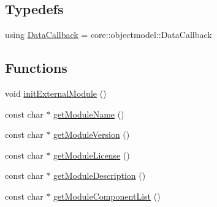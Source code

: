 \subsection*{Typedefs}
\begin{DoxyCompactItemize}
\item 
using \hyperlink{namespacesofa_1_1rgbdtracking_a00834a9204a667746fef9a402ccbfb55}{Data\+Callback} = core\+::objectmodel\+::\+Data\+Callback
\end{DoxyCompactItemize}
\subsection*{Functions}
\begin{DoxyCompactItemize}
\item 
void \hyperlink{namespacesofa_1_1rgbdtracking_a596d0c2a2b98cc3dd0091e933070ecce}{init\+External\+Module} ()
\item 
const char $\ast$ \hyperlink{namespacesofa_1_1rgbdtracking_a71f655bffd81cca5c72c2fc4a0aa72d3}{get\+Module\+Name} ()
\item 
const char $\ast$ \hyperlink{namespacesofa_1_1rgbdtracking_ac45b27a5c97c1ec95aa078ac013bcca7}{get\+Module\+Version} ()
\item 
const char $\ast$ \hyperlink{namespacesofa_1_1rgbdtracking_a3d5dee9f71234c539f75d68e90eb4120}{get\+Module\+License} ()
\item 
const char $\ast$ \hyperlink{namespacesofa_1_1rgbdtracking_a720f3a55d983babc84a6f4ce8ce7d67f}{get\+Module\+Description} ()
\item 
const char $\ast$ \hyperlink{namespacesofa_1_1rgbdtracking_a7687b3685880c0911d3f8f2e97000f5d}{get\+Module\+Component\+List} ()
\end{DoxyCompactItemize}

